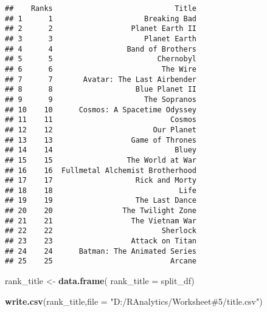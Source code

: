 \documentclass[
]{article}
\newenvironment{Shaded}{\begin{snugshade}}{\end{snugshade}}
\newcommand{\AttributeTok}[1]{\textcolor[rgb]{0.13,0.29,0.53}{#1}}
\newcommand{\FunctionTok}[1]{\textcolor[rgb]{0.13,0.29,0.53}{\textbf{#1}}}
\newcommand{\NormalTok}[1]{#1}
\newcommand{\OtherTok}[1]{\textcolor[rgb]{0.56,0.35,0.01}{#1}}
\newcommand{\StringTok}[1]{\textcolor[rgb]{0.31,0.60,0.02}{#1}}
\begin{document}
\begin{verbatim}
##    Ranks                            Title
## 1      1                     Breaking Bad
## 2      2                  Planet Earth II
## 3      3                     Planet Earth
## 4      4                 Band of Brothers
## 5      5                        Chernobyl
## 6      6                         The Wire
## 7      7       Avatar: The Last Airbender
## 8      8                   Blue Planet II
## 9      9                     The Sopranos
## 10    10      Cosmos: A Spacetime Odyssey
## 11    11                           Cosmos
## 12    12                       Our Planet
## 13    13                  Game of Thrones
## 14    14                            Bluey
## 15    15                 The World at War
## 16    16  Fullmetal Alchemist Brotherhood
## 17    17                   Rick and Morty
## 18    18                             Life
## 19    19                   The Last Dance
## 20    20                The Twilight Zone
## 21    21                  The Vietnam War
## 22    22                         Sherlock
## 23    23                  Attack on Titan
## 24    24      Batman: The Animated Series
## 25    25                           Arcane
\end{verbatim}

\begin{Shaded}
\begin{Highlighting}[]
\NormalTok{rank\_title }\OtherTok{\textless{}{-}} \FunctionTok{data.frame}\NormalTok{(}
  \AttributeTok{rank\_title =}\NormalTok{ split\_df)}

\FunctionTok{write.csv}\NormalTok{(rank\_title,}\AttributeTok{file =} \StringTok{"D:/RAnalytics/Worksheet\#5/title.csv"}\NormalTok{)}
\end{Highlighting}
\end{Shaded}
\end{document}
